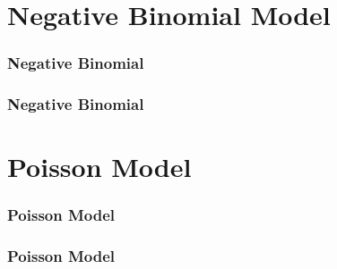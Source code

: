 \documentclass{beamer}
\begin{document}
	\section{Negative Binomial Model}
	\begin{frame}
		\frametitle{Negative Binomial}
	\end{frame}
	\begin{frame}
		\frametitle{Negative Binomial}
	\end{frame}
	
	\section{Poisson Model}
	\begin{frame}
		\frametitle{Poisson Model}
	\end{frame}
	\begin{frame}
		\frametitle{Poisson Model}
	\end{frame}
	
\end{document}
